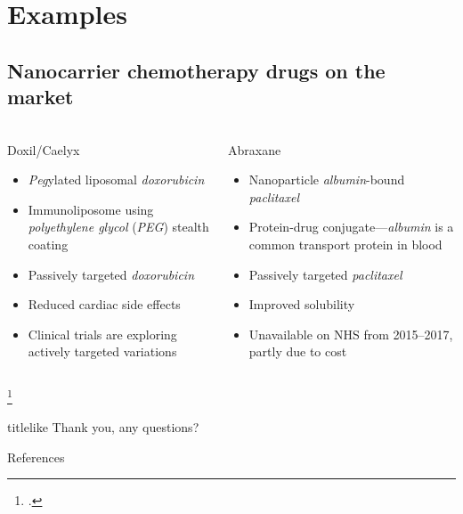 \documentclass[aspectratio=169,compress]{beamer}
\renewcommand*{\bibfont}{\tiny}
\newcommand*{\autotitle}{\subsecname\hfill\textbf{\small\secname}}
\begin{document}
\section{Examples}

\subsection{Nanocarrier chemotherapy drugs on the market}
\begin{frame}{\autotitle}
  \begin{columns}
      \begin{block}{Doxil\textsuperscript{\textregistered}/Caelyx\textsuperscript{\textregistered}~}
        \begin{itemize}
          \item \alert{\emph{Peg}ylated liposomal \emph{doxorubicin}}
          \item \alert{Immunoliposome} using \emph{polyethylene glycol} (\emph{PEG}) stealth coating
          \item \alert{Passively targeted} \emph{doxorubicin}
          \item Reduced cardiac side effects~
          \item Clinical trials are exploring \alert{actively targeted variations}~
        \end{itemize}
      \end{block}

      \begin{block}{Abraxane\textsuperscript{\textregistered}~}
        \begin{itemize}
          \item \alert{Nanoparticle \emph{albumin}-bound \emph{paclitaxel}}
          \item \alert{Protein-drug conjugate}---\emph{albumin} is a common transport protein in blood
          \item \alert{Passively targeted} \emph{paclitaxel}
          \item Improved solubility~
          \item Unavailable on NHS from 2015--2017, partly due to cost~
        \end{itemize}
      \end{block}

  \end{columns}
  \footcitetext{wicki2015nanomedicine,harrison1995liposomal,mamot2012tolerability,desai2006increased,nice2015paclitaxel}
\end{frame}

\begin{frame}
  \begin{beamercolorbox}[rounded=true,shadow=true,sep=8pt]{titlelike}\centering\Large
    Thank you, any questions?
  \end{beamercolorbox}
  \begin{block}{References}\bibfont
  \end{block}
\end{frame}
\end{document}
